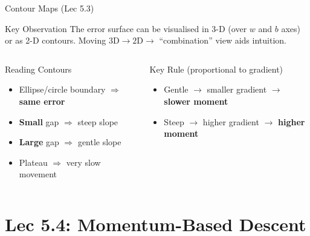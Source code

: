 \documentclass{beamer}
\begin{document}
\begin{frame}[shrink=10]{Contour Maps (Lec 5.3)}
  \begin{block}{Key Observation}
    The error surface can be visualised in 3-D (over $w$ and $b$ axes)
    or as 2-D contours.
    Moving $3\text{D}\to 2\text{D}\to$ ``combination'' view aids intuition.
  \end{block}

  \begin{columns}[T]
    \begin{block}{Reading Contours}
      \begin{itemize}\setlength\itemsep{4pt}
        \item Ellipse/circle boundary $\Rightarrow$ \textbf{same error}
        \item \textbf{Small} gap $\Rightarrow$ steep slope
        \item \textbf{Large} gap $\Rightarrow$ gentle slope
        \item Plateau $\Rightarrow$ very slow movement
      \end{itemize}
    \end{block}

    \begin{alertblock}{Key Rule (proportional to gradient)}
      \begin{itemize}\setlength\itemsep{4pt}
        \item Gentle $\to$ smaller gradient
              $\to$ \textbf{slower moment}
        \item Steep $\to$ higher gradient
              $\to$ \textbf{higher moment}
      \end{itemize}
    \end{alertblock}
  \end{columns}
\end{frame}

\section{Lec 5.4: Momentum-Based Descent}
\end{document}
